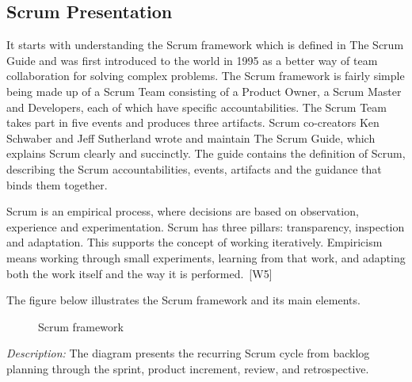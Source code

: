 \documentclass[12pt,a4paper,oneside]{report}
\newcommand{\figdesc}[1]{%
\vspace{-0.05cm}\noindent\small\textit{Description:} #1\par\normalsize\vspace{0.30cm}%
}
\begin{document}
\subsection{Scrum Presentation}\label{sumlbl:c1s7ss1}
It starts with understanding the Scrum framework which is defined in The Scrum Guide and was first introduced to the world in 1995 as a better way of team collaboration for solving complex problems.  The Scrum framework is fairly simple being made up of a Scrum Team consisting of a Product Owner, a Scrum Master and Developers, each of which have specific accountabilities. The Scrum Team takes part in five events and produces three artifacts. Scrum co-creators Ken Schwaber and Jeff Sutherland wrote and maintain The Scrum Guide, which explains Scrum clearly and succinctly.  The guide contains the definition of Scrum,  describing the Scrum accountabilities, events, artifacts and the guidance that binds them together.

Scrum is an empirical process, where decisions are based on observation, experience and experimentation. Scrum has three pillars: transparency, inspection and adaptation. This supports the concept of working iteratively. Empiricism means working through small experiments, learning from that work, and adapting both the work itself and the way it is performed.~\textup{[W5]}

The figure below illustrates the Scrum framework and its main elements.

\begin{figure}[H]
\centering
{}
\caption{Scrum framework}
\label{fig}
\end{figure}
\figdesc{The diagram presents the recurring Scrum cycle from backlog planning through the sprint, product increment, review, and retrospective.}
\end{document}
